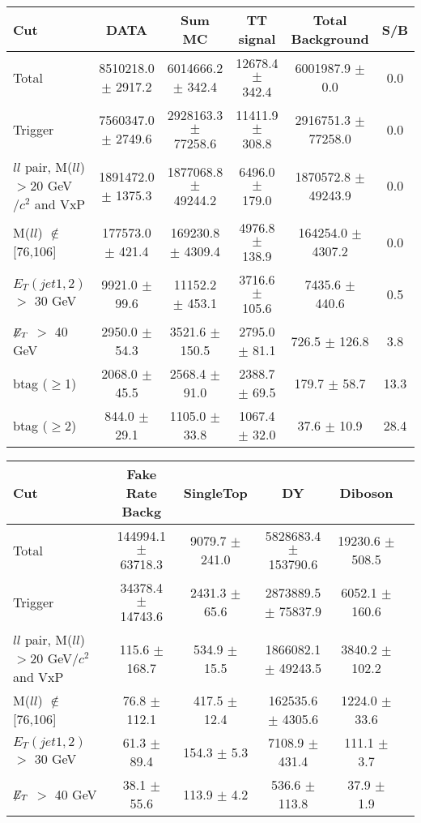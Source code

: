 \documentclass[amsmath,amssymb]{revtex4}
\begin{document}
\clearpage
\begin{landscape}
\begin{table}[p]
\begin{tabular}{|l|c|c|c|c|c|}
\hline
\hline
Cut & DATA & Sum MC & TT signal  & Total Background & S/B \\
\hline
Total & 8510218.0 $\pm$ 2917.2 & 6014666.2 $\pm$ 342.4 & 12678.4 $\pm$ 342.4 & 6001987.9 $\pm$ 0.0 & 0.0 \\
Trigger & 7560347.0 $\pm$ 2749.6 & 2928163.3 $\pm$ 77258.6 & 11411.9 $\pm$ 308.8 & 2916751.3 $\pm$ 77258.0 & 0.0 \\
$ll$ pair, M($ll$)$>$20 GeV$/c^2$ and VxP & 1891472.0 $\pm$ 1375.3 & 1877068.8 $\pm$ 49244.2 & 6496.0 $\pm$ 179.0 & 1870572.8 $\pm$ 49243.9 & 0.0 \\
M($ll$) $\notin$ [76,106] & 177573.0 $\pm$ 421.4 & 169230.8 $\pm$ 4309.4 & 4976.8 $\pm$ 138.9 & 164254.0 $\pm$ 4307.2 & 0.0 \\
$E_T(jet1,2)$ $>$ 30 GeV & 9921.0 $\pm$ 99.6 & 11152.2 $\pm$ 453.1 & 3716.6 $\pm$ 105.6 & 7435.6 $\pm$ 440.6 & 0.5 \\
$\not\!\!E_T$ $>$ 40 GeV & 2950.0 $\pm$ 54.3 & 3521.6 $\pm$ 150.5 & 2795.0 $\pm$ 81.1 & 726.5 $\pm$ 126.8 & 3.8 \\
btag ($\ge$1) & 2068.0 $\pm$ 45.5 & 2568.4 $\pm$ 91.0 & 2388.7 $\pm$ 69.5 & 179.7 $\pm$ 58.7 & 13.3 \\
btag ($\ge$2) & 844.0 $\pm$ 29.1 & 1105.0 $\pm$ 33.8 & 1067.4 $\pm$ 32.0 & 37.6 $\pm$ 10.9 & 28.4 \\
\hline
\hline
\end{tabular}
\begin{tabular}{|l|c|c|c|c|c|}
\hline
\hline
Cut & Fake Rate Backg & SingleTop & DY & Diboson  \\
\hline
Total & 144994.1 $\pm$ 63718.3 & 9079.7 $\pm$ 241.0 & 5828683.4 $\pm$ 153790.6 & 19230.6 $\pm$ 508.5 \\
Trigger & 34378.4 $\pm$ 14743.6 & 2431.3 $\pm$ 65.6 & 2873889.5 $\pm$ 75837.9 & 6052.1 $\pm$ 160.6 \\
$ll$ pair, M($ll$)$>$20 GeV$/c^2$ and VxP & 115.6 $\pm$ 168.7 & 534.9 $\pm$ 15.5 & 1866082.1 $\pm$ 49243.5 & 3840.2 $\pm$ 102.2 \\
M($ll$) $\notin$ [76,106] & 76.8 $\pm$ 112.1 & 417.5 $\pm$ 12.4 & 162535.6 $\pm$ 4305.6 & 1224.0 $\pm$ 33.6 \\
$E_T(jet1,2)$ $>$ 30 GeV & 61.3 $\pm$ 89.4 & 154.3 $\pm$ 5.3 & 7108.9 $\pm$ 431.4 & 111.1 $\pm$ 3.7 \\
$\not\!\!E_T$ $>$ 40 GeV & 38.1 $\pm$ 55.6 & 113.9 $\pm$ 4.2 & 536.6 $\pm$ 113.8 & 37.9 $\pm$ 1.9 \\

\end{tabular}
\end{table}
\end{landscape}
\end{document}
